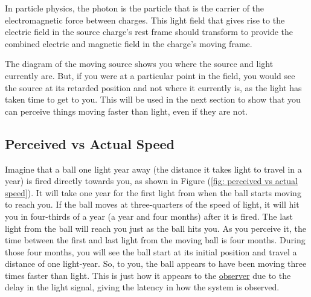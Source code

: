 In particle physics, the photon is the particle that is the carrier of the electromagnetic force between charges.
This light field that gives rise to the electric field in the source charge's rest frame should transform to provide the combined electric and magnetic field in the charge's moving frame.

The diagram of the moving source shows you where the source and light currently are.
But, if you were at a particular point in the field, you would see the source at its retarded position and not where it currently is, as the light has taken time to get to you.
This will be used in the next section to show that you can perceive things moving faster than light, even if they are not.


\subsection{Perceived vs Actual Speed}

Imagine that a ball one light year away (the distance it takes light to travel in a year) is fired directly towards you, as shown in Figure (\ref{fig: perceived vs actual speed}).
It will take one year for the first light from when the ball starts moving to reach you.
If the ball moves at three-quarters of the speed of light, it will hit you in four-thirds of a year (a year and four months) after it is fired.
The last light from the ball will reach you just as the ball hits you.
As you perceive it, the time between the first and last light from the moving ball is four months.
During those four months, you will see the ball start at its initial position and travel a distance of one light-year.
So, to you, the ball appears to have been moving three times faster than light.
This is just how it appears to the \hyperlink{def-observer}{observer} due to the delay in the light signal, giving the latency in how the system is observed.

